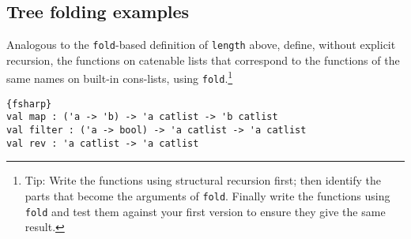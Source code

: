 \subsection*{Tree folding examples}

Analogous to the \verb|fold|-based definition of \verb|length| above, define, without explicit recursion, the functions on catenable lists that correspond to the functions of the same names on built-in cons-lists, using \verb|fold|.\footnote{Tip: Write the functions using structural recursion first; then identify the parts that become the arguments of \texttt{fold}. Finally write the functions using \texttt{fold} and test them against your first version to ensure they give the same result.}  

\begin{lstlisting}{fsharp}
val map : ('a -> 'b) -> 'a catlist -> 'b catlist 
val filter : ('a -> bool) -> 'a catlist -> 'a catlist 
val rev : 'a catlist -> 'a catlist
\end{lstlisting}
